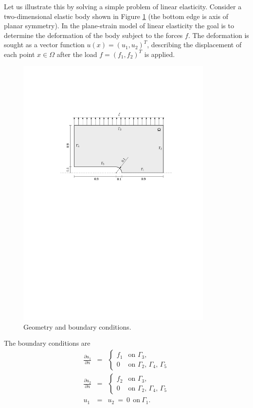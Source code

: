 \documentclass[11pt]{article}
\newcommand{\dd}[2]{\frac{\partial #1}{\partial #2}}
\begin{document}
Let us illustrate this by solving a simple problem of linear elasticity. Consider a
two-dimensional elastic body shown in Figure \ref{elastsample} (the bottom edge is
axis of planar symmetry).
In the plane-strain model of linear elasticity the goal is to determine the
deformation of the body subject to the forces $f$. The deformation is sought
as a vector function $u(x) = (u_1, u_2)^T$, describing the displacement of each point
$x \in \Omega$ after the load $f = (f_1, f_2)^T$ is applied.

\begin{figure}[!ht]
  \vspace{-2mm}
  \medskip\centering
  \includegraphics[width=0.87\textwidth]{img/elastsample}
  \caption{Geometry and boundary conditions.}
  \label{elastsample}
\end{figure}

The boundary conditions are
\begin{eqnarray}
  \dd{u_1}{n} &=&
  \begin{cases}
    f_1 & \text{on $\Gamma_3$,}\\
    0   & \text{on $\Gamma_2$, $\Gamma_4$, $\Gamma_5$}
  \end{cases}\label{elastbc1}
  \\
  \dd{u_2}{n} &=&
  \begin{cases}
    f_2 & \text{on $\Gamma_3$,}\\
    0   & \text{on $\Gamma_2$, $\Gamma_4$, $\Gamma_5$}
  \end{cases}\label{elastbc2}
  \\[2mm]
  u_1 &=& u_2 \ = \ 0 \ \ \mbox{on} \ \Gamma_1. \label{elastbc3}
\end{eqnarray}
\end{document}

